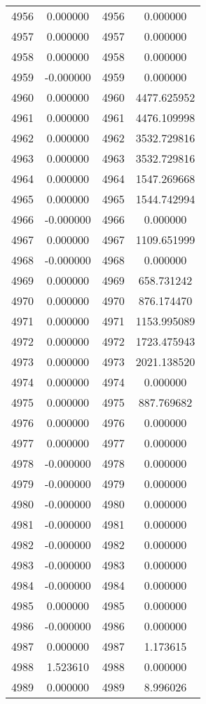 \documentclass[12pt]{article}
\begin{document}
\begin{longtable}{@{}cccc@{}}
4956 & 0.000000 & 4956 & 0.000000 \\
4957 & 0.000000 & 4957 & 0.000000 \\
4958 & 0.000000 & 4958 & 0.000000 \\
4959 & -0.000000 & 4959 & 0.000000 \\
4960 & 0.000000 & 4960 & 4477.625952 \\
4961 & 0.000000 & 4961 & 4476.109998 \\
4962 & 0.000000 & 4962 & 3532.729816 \\
4963 & 0.000000 & 4963 & 3532.729816 \\
4964 & 0.000000 & 4964 & 1547.269668 \\
4965 & 0.000000 & 4965 & 1544.742994 \\
4966 & -0.000000 & 4966 & 0.000000 \\
4967 & 0.000000 & 4967 & 1109.651999 \\
4968 & -0.000000 & 4968 & 0.000000 \\
4969 & 0.000000 & 4969 & 658.731242 \\
4970 & 0.000000 & 4970 & 876.174470 \\
4971 & 0.000000 & 4971 & 1153.995089 \\
4972 & 0.000000 & 4972 & 1723.475943 \\
4973 & 0.000000 & 4973 & 2021.138520 \\
4974 & 0.000000 & 4974 & 0.000000 \\
4975 & 0.000000 & 4975 & 887.769682 \\
4976 & 0.000000 & 4976 & 0.000000 \\
4977 & 0.000000 & 4977 & 0.000000 \\
4978 & -0.000000 & 4978 & 0.000000 \\
4979 & -0.000000 & 4979 & 0.000000 \\
4980 & -0.000000 & 4980 & 0.000000 \\
4981 & -0.000000 & 4981 & 0.000000 \\
4982 & -0.000000 & 4982 & 0.000000 \\
4983 & -0.000000 & 4983 & 0.000000 \\
4984 & -0.000000 & 4984 & 0.000000 \\
4985 & 0.000000 & 4985 & 0.000000 \\
4986 & -0.000000 & 4986 & 0.000000 \\
4987 & 0.000000 & 4987 & 1.173615 \\
4988 & 1.523610 & 4988 & 0.000000 \\
4989 & 0.000000 & 4989 & 8.996026 \\

\end{longtable}
\end{document}
